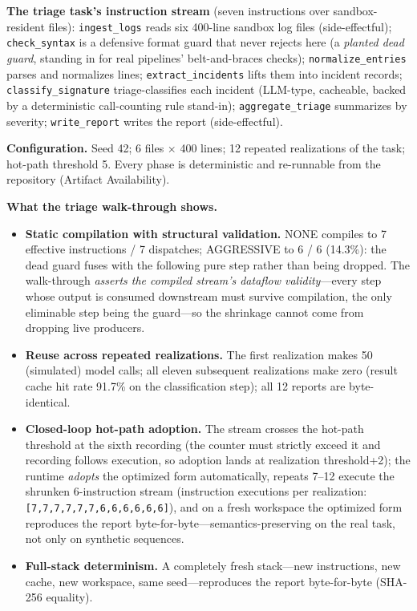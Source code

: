 \documentclass[
  11pt,
]{article}
\providecommand{\tightlist}{%
  \setlength{\itemsep}{0pt}\setlength{\parskip}{0pt}}
\begin{document}
\textbf{The triage task's instruction stream} (seven instructions over
sandbox-resident files): \texttt{ingest\_logs} reads six 400-line
sandbox log files (side-effectful); \texttt{check\_syntax} is a
defensive format guard that never rejects here (a \emph{planted dead
guard}, standing in for real pipelines' belt-and-braces checks);
\texttt{normalize\_entries} parses and normalizes lines;
\texttt{extract\_incidents} lifts them into incident records;
\texttt{classify\_signature} triage-classifies each incident (LLM-type,
cacheable, backed by a deterministic call-counting rule stand-in);
\texttt{aggregate\_triage} summarizes by severity;
\texttt{write\_report} writes the report (side-effectful).

\textbf{Configuration.} Seed 42; 6 files \(\times\) 400 lines; 12
repeated realizations of the task; hot-path threshold 5. Every phase is
deterministic and re-runnable from the repository (Artifact
Availability).

\textbf{What the triage walk-through shows.}

\begin{itemize}
\tightlist
\item
  \textbf{Static compilation with structural validation.} NONE compiles
  to 7 effective instructions / 7 dispatches; AGGRESSIVE to 6 / 6
  (14.3\%): the dead guard fuses with the following pure step rather
  than being dropped. The walk-through \emph{asserts the compiled
  stream's dataflow validity}---every step whose output is consumed
  downstream must survive compilation, the only eliminable step being
  the guard---so the shrinkage cannot come from dropping live producers.
\item
  \textbf{Reuse across repeated realizations.} The first realization
  makes 50 (simulated) model calls; all eleven subsequent realizations
  make zero (result cache hit rate 91.7\% on the classification step);
  all 12 reports are byte-identical.
\item
  \textbf{Closed-loop hot-path adoption.} The stream crosses the
  hot-path threshold at the sixth recording (the counter must strictly
  exceed it and recording follows execution, so adoption lands at
  realization threshold+2); the runtime \emph{adopts} the optimized form
  automatically, repeats 7--12 execute the shrunken 6-instruction stream
  (instruction executions per realization:
  \texttt{{[}7,7,7,7,7,7,6,6,6,6,6,6{]}}), and on a fresh workspace the
  optimized form reproduces the report
  byte-for-byte---semantics-preserving on the real task, not only on
  synthetic sequences.
\item
  \textbf{Full-stack determinism.} A completely fresh stack---new
  instructions, new cache, new workspace, same seed---reproduces the
  report byte-for-byte (SHA-256 equality).
\end{itemize}
\end{document}
